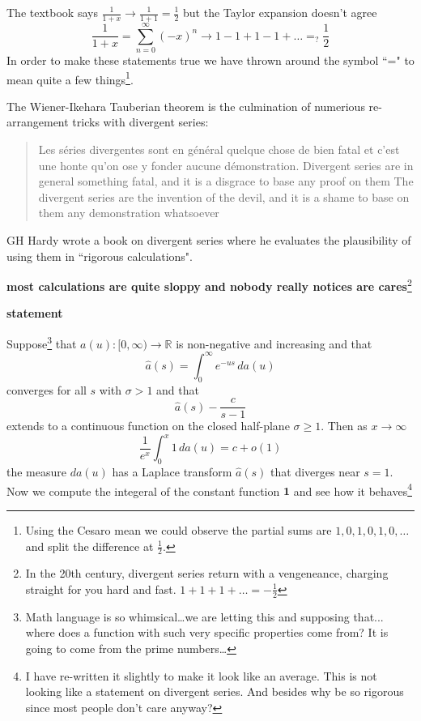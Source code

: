 \documentclass[12pt]{article}
\begin{document}
\noindent The textbook says $\frac{1}{1+x} \to \frac{1}{1+1} = \frac{1}{2}$ but the Taylor expansion doesn't agree
$$\frac{1}{1+x}  = \sum_{n=0}^\infty (- x)^n \to 1 - 1 + 1 - 1 + \dots =_? \frac{1}{2}$$
In order to make these statements true we have thrown around the symbol ``=" to mean quite a few things\footnote{Using the Cesaro mean we could observe the partial sums are $1,0,1,0,1,0,\dots$ and split the difference at $\frac{1}{2}$.}. \newpage

\noindent The Wiener-Ikehara Tauberian theorem is the culmination of numerious re-arrangement tricks with divergent series:
\begin{quotation}
\noindent Les s\'{e}ries divergentes sont en g\'{e}n\'{e}ral quelque chose de bien fatal et c'est une honte qu'on ose y fonder aucune d\'{e}monstration. \newline \newline
Divergent series are in general something fatal, and it is a disgrace to base any proof on them \newline \newline
The divergent series are the invention of the devil, and it is a shame to base on them any demonstration whatsoever
\end{quotation}
GH Hardy wrote a book on divergent series where he evaluates the plausibility of using them in ``rigorous calculations". \newline 

\noindent \textbf{most calculations are quite sloppy and nobody really notices are cares}\footnote{In the 20th century, divergent series return with a vengeneance, charging straight for you hard and fast.  $1 + 1 + 1 + \dots = - \frac{1}{2}$ }

\newpage

\noindent \textbf{statement} \newline

\noindent Suppose\footnote{Math language is so whimsical\dots we are letting this and supposing that... where does a function with such very specific properties come from?  It is going to come from the prime numbers\dots} that $a(u): [0, \infty) \to \mathbb{R}$ is non-negative and increasing and that
$$ \hat{a}(s) = \int_0^\infty e^{-us}\, da(u) $$
converges for all $s$ with $\sigma > 1$ and that 
$$ \hat{a}(s) - \frac{c}{s-1} $$
extends to a continuous function on the closed half-plane $\sigma \geq 1$.  Then as $x \to \infty$
$$ \frac{1}{e^x}\int_0^x 1 \, da(u) = c + o(1) $$
{\color{black!50!white}{\hrule}}
\vspace{12pt}
\noindent the measure $da(u)$ has a Laplace transform $\hat{a}(s)$ that diverges near $s=1$.  Now we compute the integeral of the constant function $\mathbf{1}$ and see how it behaves\footnote{I have re-written it slightly to make it look like an average. This is not looking like a statement on divergent series.  And besides why be so rigorous since most people don't care anyway?}
\end{document}
